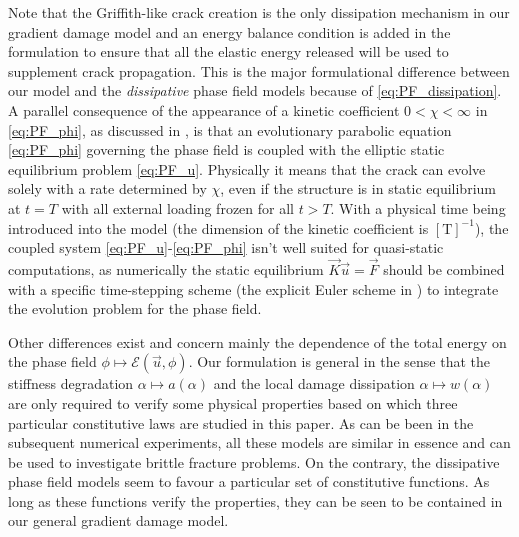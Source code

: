 Note that the Griffith-like crack creation is the only dissipation mechanism in our gradient damage model and an energy balance condition is added in the formulation to ensure that all the elastic energy released will be used to supplement crack propagation. This is the major formulational difference between our model and the \emph{dissipative} phase field models because of \eqref{eq:PF_dissipation}. A parallel consequence of the appearance of a kinetic coefficient $0<\chi<\infty$ in \eqref{eq:PF_phi}, as discussed in \cite{Bourdin:2011}, is that an evolutionary parabolic equation \eqref{eq:PF_phi} governing the phase field is coupled with the elliptic static equilibrium problem \eqref{eq:PF_u}. Physically it means that the crack can evolve solely with a rate determined by $\chi$, even if the structure is in static equilibrium at $t=T$ with all external loading frozen for all $t>T$. With a physical time being introduced into the model (the dimension of the kinetic coefficient is $[\mathrm{T}]^{-1}$), the coupled system \eqref{eq:PF_u}-\eqref{eq:PF_phi} isn't well suited for quasi-static computations, as numerically the static equilibrium  $\vec{K}\vec{u}=\vec{F}$ should be combined with a specific time-stepping scheme (the explicit Euler scheme in \cite{HakimKarma:2009}) to integrate the evolution problem for the phase field.

Other differences exist and concern mainly the dependence of the total energy on the phase field $\phi\mapsto\mathcal{E}(\vec{u},\phi)$. Our formulation is general in the sense that the stiffness degradation $\alpha\mapsto a(\alpha)$ and the local damage dissipation $\alpha\mapsto w(\alpha)$ are only required to verify some physical properties based on which three particular constitutive laws are studied in this paper. As can be been in the subsequent numerical experiments, all these models are similar in essence and can be used to investigate brittle fracture problems. On the contrary, the dissipative phase field models \cite{KarmaKesslerLevine:2001,HakimKarma:2009} seem to favour a particular set of constitutive functions. As long as these functions verify the properties, they can be seen to be contained in our general gradient damage model.

